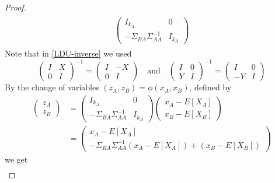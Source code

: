 \documentclass{book}
\theoremstyle{plain}%
\theoremstyle{definition}
\begin{document}
\begin{proof}
\begin{align}
\begin{split}
        \begin{pmatrix}
            I_{k_A} & 0\\
            -\Sigma_{BA}\Sigma_{AA}^{-1} & I_{k_B}
        \end{pmatrix}
        \end{split}
        \end{align}
        Note that in \eqref{LDU-inverse} we used 
        $$
        \begin{pmatrix}
            I & X \\ 0 & I
        \end{pmatrix}^{-1}
        =
        \begin{pmatrix}
            I & -X \\ 0 & I
        \end{pmatrix}
        \quad\text{and}\quad
        \begin{pmatrix}
            I & 0 \\ Y & I
        \end{pmatrix}^{-1}
        =
        \begin{pmatrix}
            I & 0 \\ -Y & I
        \end{pmatrix}
        $$
        By the change of variables $(z_A,z_B)=\phi(x_A,x_B)$, defined by
        \begin{align*}
            \begin{pmatrix}
                z_A \\ z_B
            \end{pmatrix}  
            &=
            \begin{pmatrix}
            I_{k_A} & 0\\[0.2em]
            -\Sigma_{BA}\Sigma_{AA}^{-1} & I_{k_B}
            \end{pmatrix}
            \begin{pmatrix}
                x_A-E[X_A] \\[0.2em]
                x_B-E[X_B]
            \end{pmatrix}\\[0.3em]
            &=
            \begin{pmatrix}
                x_A-E[X_A] \\[0.2em] -\Sigma_{BA}\Sigma_{AA}^{-1} 
                (x_A-E[X_A])+(x_B-E[X_B])
            \end{pmatrix}
        \end{align*}
        we get
        \begin{align*}

\end{align*}
\end{proof}
\end{document}
